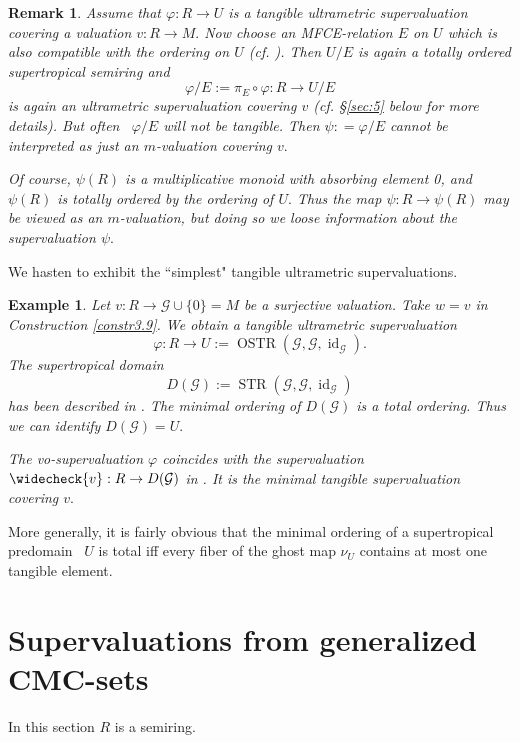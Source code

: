 \documentclass [12pt,a4paper,reqno]{amsart}
\newtheorem{example}[thm]{Example}
\newtheorem{remark}[thm]{Remark}
\begin{document}
\begin{remark}\label{rem3.12}
Assume that $\varphi: R\to U$ is a tangible ultrametric
supervaluation covering a valuation $v: R\to M.$ Now choose an
MFCE-relation $E$ on $U$ which is also compatible with the
ordering on $U$ (cf. \cite[\S4]{IKR2}). Then $U/E$ is again a
totally ordered supertropical  semiring and
$$\varphi/E :=\pi_E\circ\varphi: R\to U/E$$
is again an ultrametric supervaluation covering $v$ (cf.
\S\ref{sec:5} below for more details). But often~ $\varphi/E$ will
not be tangible. Then $\psi: =\varphi/E$ cannot be interpreted as
just an $m$-valuation covering $v.$

 Of course, $\psi(R)$ is a
multiplicative monoid with absorbing element 0, and $\psi(R)$ is
totally ordered by the ordering of $U.$ Thus the map $\psi: R\to
\psi(R)$ may be viewed as an $m$-valuation, but doing so we loose
information about the supervaluation $\psi.$\end{remark}

We hasten to exhibit the ``simplest" tangible ultrametric
supervaluations.

\begin{example}\label{examps3.13} Let $v: R\to {\mathcal G} \cup\{0\}=M$ be a surjective valuation. Take $w=v$ in
Construction \ref{constr3.9}. We obtain a tangible ultrametric
supervaluation
$$\varphi: R\to U:={\operatorname{OSTR}}({\mathcal G},{\mathcal G},{\operatorname{id}}_{\mathcal G}).$$ The supertropical domain
$$D({\mathcal G}):={\operatorname{STR}}({\mathcal G},{\mathcal G},{\operatorname{id}}_{\mathcal G})$$
has been described in \cite[\S3]{IKR1}. The minimal ordering of
$D({\mathcal G} )$ is a total ordering. Thus we can identify $D({\mathcal G} )=U.$

The vo-supervaluation $\varphi$ coincides with the supervaluation
${\widecheck{v}}: R\to D({\mathcal G} )$ in \cite[Example 9.16]{IKR1}. It is the
minimal tangible supervaluation covering $v.$\end{example}

More generally, it is fairly obvious that the minimal ordering of
a supertropical predomain~ $U$ is total iff every fiber of the
ghost map $\nu_U$ contains at most one tangible element.

\section{Supervaluations from generalized CMC-sets}\label{sec:4}

In this section $R$ is a semiring.
\end{document}
